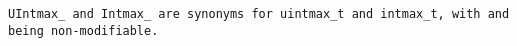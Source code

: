 \tt{UIntmax_} and \tt{Intmax_} are synonyms for \tt{uintmax_t} and \tt{intmax_t},
with  and  being non-modifiable.
